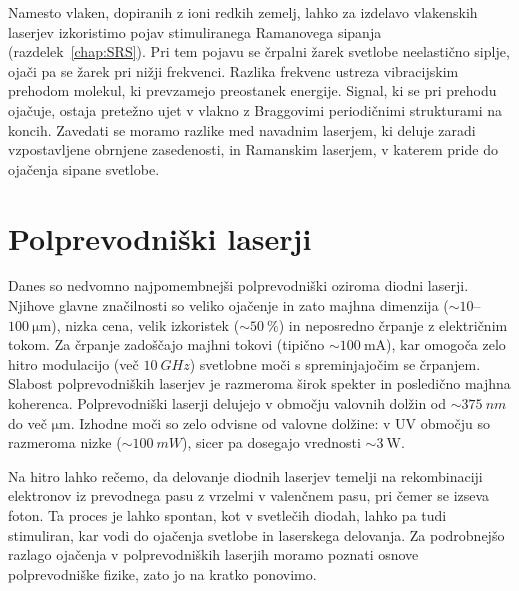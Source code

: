\begin{remark}
 Namesto vlaken, dopiranih z ioni redkih zemelj, lahko za izdelavo vlakenskih laserjev
 izkoristimo pojav stimuliranega Ramanovega sipanja (razdelek~\ref{chap:SRS}). 
 Pri tem pojavu se črpalni žarek svetlobe neelastično siplje, ojači pa se žarek 
 pri nižji frekvenci. Razlika frekvenc ustreza vibracijskim prehodom 
 molekul, ki prevzamejo preostanek energije. Signal, ki se pri prehodu ojačuje, 
 ostaja pretežno ujet v vlakno z Braggovimi periodičnimi strukturami na koncih.
 Zavedati se moramo razlike med navadnim laserjem, ki deluje zaradi vzpostavljene
 obrnjene zasedenosti, in Ramanskim laserjem, v katerem pride do ojačenja sipane
 svetlobe.
\end{remark}

\section{Polprevodniški laserji}
\label{chap:SCL}
Danes so nedvomno najpomembnejši polprevodniški oziroma diodni 
laserji. Njihove glavne značilnosti so veliko ojačenje in zato majhna 
dimenzija ($\sim 10$--$100~\si{\micro\metre}$), nizka cena, 
velik izkoristek ($\sim 50~\%$) in neposredno črpanje z električnim tokom. 
Za črpanje zadoščajo majhni tokovi 
(tipično $\sim 100~\si{\milli\ampere}$), kar omogoča zelo hitro modulacijo (več $10~\si{GHz}$)
svetlobne moči s spreminjajočim se črpanjem. Slabost polprevodniških laserjev je razmeroma širok 
spekter in posledično majhna koherenca. Polprevodniški laserji delujejo v območju 
valovnih dolžin od $\sim 375~\si{nm}$ do več $\si{\micro\meter}$. Izhodne moči
so zelo odvisne od valovne dolžine: v UV območju so razmeroma nizke ($\sim 100~\si{mW}$),
sicer pa dosegajo vrednosti $\sim 3~\si{\watt}$.

Na hitro lahko rečemo, da delovanje diodnih laserjev temelji na rekombinaciji  
elektronov iz prevodnega pasu z vrzelmi v valenčnem pasu, pri čemer se izseva foton. Ta proces je lahko 
spontan, kot v svetlečih diodah, lahko pa tudi stimuliran, kar vodi do ojačenja svetlobe 
in laserskega delovanja. Za podrobnejšo razlago ojačenja v polprevodniških 
laserjih moramo poznati osnove polprevodniške fizike, zato jo na kratko ponovimo.  

